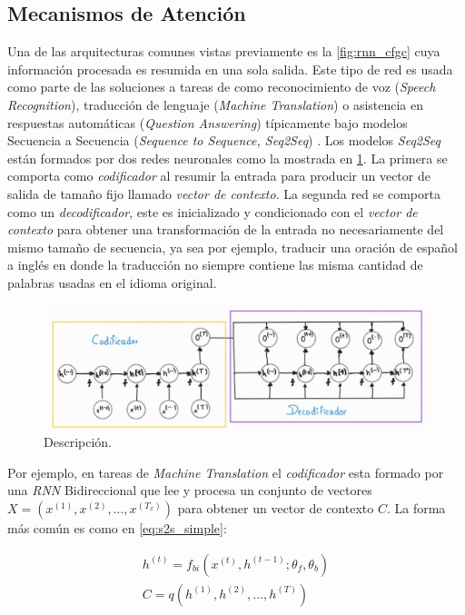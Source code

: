 \subsection{Mecanismos de Atención} \label{section:att}

Una de las arquitecturas comunes vistas previamente es la \ref{fig:rnn_cfgc} cuya información
procesada es resumida en una sola salida. Este tipo de red es usada como parte de las soluciones a
tareas de como reconocimiento de voz (\textit{Speech Recognition}), traducción de lenguaje
(\textit{Machine Translation}) o asistencia en respuestas automáticas (\textit{Question Answering})
típicamente bajo modelos Secuencia a Secuencia (\textit{Sequence to Sequence, Seq2Seq})
\cite{DBLP:journals/corr/ChoMGBSB14}. Los modelos
\textit{Seq2Seq} están formados por dos redes neuronales como la mostrada en \ref{fig:seq2seq}. La
primera se comporta como \textit{codificador} al resumir la entrada para producir un vector de salida
de tamaño fijo llamado \textit{vector de contexto}. La segunda red se comporta como un
\textit{decodificador}, este es inicializado y condicionado con el
\textit{vector de contexto} para obtener una transformación de la entrada no necesariamente del
mismo tamaño de secuencia, ya sea por ejemplo, traducir una oración de español a inglés en donde la
traducción no siempre contiene las misma cantidad de palabras usadas en el idioma original.

\begin{figure}[ht!]
    \centering
    \includegraphics[width=1.0 \textwidth]{Chapters/1. Transformer/Figures/rnn/seq2seq.jpg}
    \caption{Descripción.}
    \label{fig:seq2seq}
\end{figure}

Por ejemplo, en tareas de \textit{Machine Translation} el \textit{codificador} esta formado por una
\textit{RNN} Bidireccional que lee y procesa un conjunto de
vectores $X = (x^{(1)}, x^{(2)}, \dots, x^{(T_x)})$ para obtener un vector de contexto $C$. La forma
más común es como en \ref{eq:s2s_simple}:

\begin{equation}
    \begin{split}
        h^{(t)} = f_{bi}(x^{(t)}, h^{(t-1)}; \theta_{f}, \theta_{b}) \\
        C = q({h^{(1)}, h^{(2)}, \dots, h^{(T)}})
    \end{split}
    \label{eq:s2s_simple}
\end{equation}

